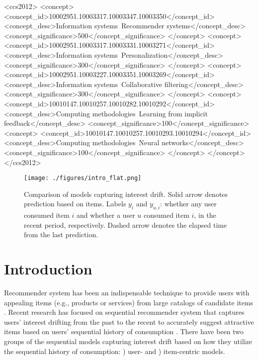 \documentclass[sigconf]{acmart}
\begin{document}
\begin{CCSXML}
<ccs2012>
<concept>
<concept_id>10002951.10003317.10003347.10003350</concept_id>
<concept_desc>Information systems~Recommender systems</concept_desc>
<concept_significance>500</concept_significance>
</concept>
<concept>
<concept_id>10002951.10003317.10003331.10003271</concept_id>
<concept_desc>Information systems~Personalization</concept_desc>
<concept_significance>300</concept_significance>
</concept>
<concept>
<concept_id>10002951.10003227.10003351.10003269</concept_id>
<concept_desc>Information systems~Collaborative filtering</concept_desc>
<concept_significance>300</concept_significance>
</concept>
<concept>
<concept_id>10010147.10010257.10010282.10010292</concept_id>
<concept_desc>Computing methodologies~Learning from implicit feedback</concept_desc>
<concept_significance>100</concept_significance>
<concept>
<concept_id>10010147.10010257.10010293.10010294</concept_id>
<concept_desc>Computing methodologies~Neural networks</concept_desc>
<concept_significance>100</concept_significance>
</concept>
</concept>
</ccs2012>
\end{CCSXML}







\maketitle

\begin{figure}[t]
	\centering
	\texttt{[image: ./figures/intro\_flat.png]}
	\caption{Comparison of models capturing interest drift. Solid arrow denotes prediction based on items.
	Labels $y_i$ and $y_{u,i}$: whether any user consumed item $i$ and whether a user $u$ consumed item $i$, in the recent period, respectively. Dashed arrow denotes the elapsed time from the last prediction.}
	\label{fig:intro}
\end{figure}

\section{Introduction}
Recommender system has been an indispensable technique to provide users with appealing items (e.g., products or services) from large catalogs of candidate items \cite{adomavicius2005toward}. Recent research has focused on sequential recommender system that captures users' interest drifting from the past to the recent to accurately suggest attractive items based on users' sequential history of consumption \cite{kang2018self,ma2019hierarchical,hyun2020interest,li2021lightweight}. 
There have been two groups of the sequential models capturing interest drift based on how they utilize the sequential history of consumption:  {}) user- and {}) item-centric models.  
\end{document}
